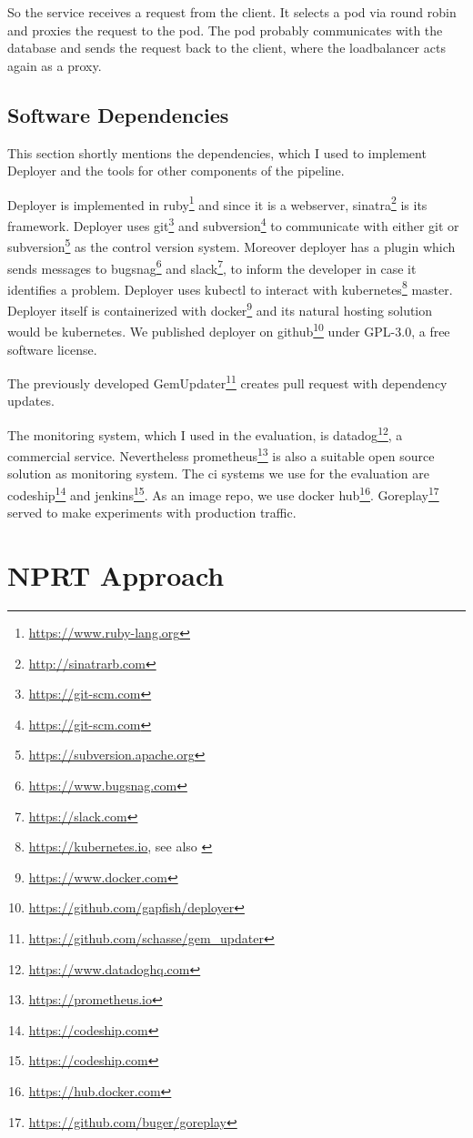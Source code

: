 So the service receives a request from the client. It selects a pod via round robin and
proxies the request to the pod. The pod probably communicates with the database and sends
the request back to the client, where the loadbalancer acts again as a proxy.

\section{Software Dependencies}

This section shortly mentions the dependencies, which I used to implement Deployer and the
tools for other components of the pipeline.

Deployer is implemented in ruby\footnote{\url{https://www.ruby-lang.org}} and since it is
a webserver, sinatra\footnote{\url{http://sinatrarb.com}} is its framework. Deployer uses
git\footnote{\url{https://git-scm.com}} and subversion\footnote{\url{https://git-scm.com}}
to communicate with either git or subversion\footnote{\url{https://subversion.apache.org}}
as the control version system. Moreover deployer has a plugin which sends messages to
bugsnag\footnote{\url{https://www.bugsnag.com}} and
slack\footnote{\url{https://slack.com}}, to inform the developer in case it identifies a
problem. Deployer uses kubectl to interact with
kubernetes\footnote{\url{https://kubernetes.io}, see also
  \cite{kubernetes_architecture,kubernetes_architecture2}} master. Deployer itself is
containerized with docker\footnote{\url{https://www.docker.com}} and its natural hosting
solution would be kubernetes. We published deployer on
github\footnote{\url{https://github.com/gapfish/deployer}} under GPL-3.0, a free software
license.

The previously developed GemUpdater\footnote{\url{https://github.com/schasse/gem_updater}}
creates pull request with dependency updates.

The monitoring system, which I used in the evaluation, is
datadog\footnote{\url{https://www.datadoghq.com}}, a commercial service. Nevertheless
prometheus\footnote{\url{https://prometheus.io}} is also a suitable open source solution
as monitoring system. The \gls{ci} systems we use for the evaluation are
codeship\footnote{\url{https://codeship.com}} and
jenkins\footnote{\url{https://codeship.com}}. As an image repo, we use docker
hub\footnote{\url{https://hub.docker.com}}. Goreplay\footnote{\url{https://github.com/buger/goreplay}}
served to make experiments with production traffic.

\chapter{NPRT Approach}
\label{chap:macro}

